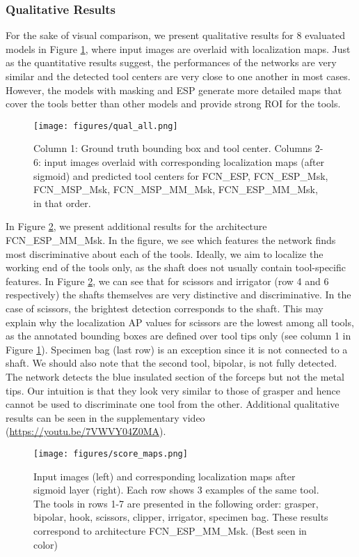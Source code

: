 \documentclass[english,runningheads,a4paper]{llncs}
\begin{document}
\subsubsection{Qualitative Results}
For the sake of visual comparison, we present qualitative results for 8 evaluated models in Figure \ref{fig:qual_all}, where input images are overlaid with localization maps. Just as the quantitative results suggest, the performances of the networks are very similar and the detected tool centers are very close to one another in most cases. However, the models with masking and ESP generate more detailed maps that cover the tools better than other models and provide strong ROI for the tools.
\begin{figure}[t]
    \centering
    \texttt{[image: figures/qual\_all.png]}
    \caption{Column 1: Ground truth bounding box and tool center. Columns 2-6: input images overlaid with corresponding localization maps (after sigmoid) and predicted tool centers for FCN\_ESP, FCN\_ESP\_Msk, FCN\_MSP\_Msk, FCN\_MSP\_MM\_Msk, FCN\_ESP\_MM\_Msk, in that order.}
    \label{fig:qual_all}
\end{figure} 

In Figure \ref{fig:score_maps}, we present additional results for the architecture FCN\_ESP\_MM\_Msk.
In the figure, we see which features the network finds most discriminative about each of the tools. Ideally, we aim to localize the working end of the tools only, as the shaft does not usually contain tool-specific features. In Figure \ref{fig:score_maps}, we can see that for scissors and irrigator (row 4 and 6 respectively) the shafts themselves are very distinctive and discriminative. In the case of scissors, the brightest detection corresponds to the shaft. This may explain why the localization AP values for scissors are the lowest among all tools, as the annotated bounding boxes are defined over tool tips only (see column 1 in Figure \ref{fig:qual_all}). Specimen bag (last row) is an exception since it is not connected to a shaft.
We should also note that the second tool, bipolar, is not fully detected. The network detects the blue insulated section of the forceps but not the metal tips. Our intuition is that they look very similar to those of grasper and hence cannot be used to discriminate one tool from the other. Additional qualitative results can be seen in the supplementary video (\href{https://youtu.be/7VWVY04Z0MA}{https://youtu.be/7VWVY04Z0MA}).
\begin{figure}[t]
    \centering
    \texttt{[image: figures/score\_maps.png]}
    \caption{Input images (left) and corresponding localization maps after sigmoid layer (right). Each row shows 3 examples of the same tool. The tools in rows 1-7 are presented in the following order: grasper, bipolar, hook, scissors, clipper, irrigator, specimen bag. These results correspond to architecture FCN\_ESP\_MM\_Msk. (Best seen in color)}
    \label{fig:score_maps}
\end{figure}
\end{document}
